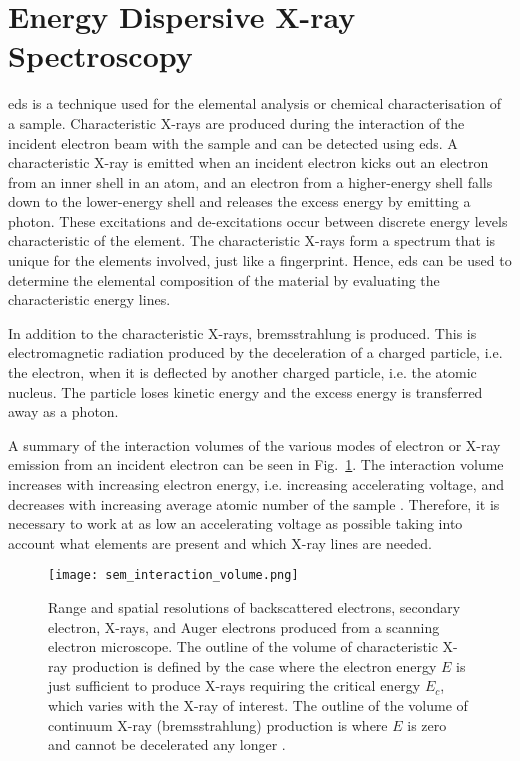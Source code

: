 \section{Energy Dispersive X-ray Spectroscopy}\label{sec:eds}
\Acf{eds} is a technique used for the elemental analysis or chemical characterisation of a sample. Characteristic X-rays are produced during the interaction of the incident electron beam with the sample and can be detected using \ac{eds}. A characteristic X-ray is emitted when an incident electron kicks out an electron from an inner shell in an atom, and an electron from a higher-energy shell falls down to the lower-energy shell and releases the excess energy by emitting a photon. These excitations and de-excitations occur between discrete energy levels characteristic of the element. The characteristic X-rays form a spectrum that is unique for the elements involved, just like a fingerprint. Hence, \ac{eds} can be used to determine the elemental composition of the material by evaluating the characteristic energy lines. 

In addition to the characteristic X-rays, bremsstrahlung is produced. This is electromagnetic radiation produced by the deceleration of a charged particle, i.e. the electron, when it is deflected by another charged particle, i.e. the atomic nucleus. The particle loses kinetic energy and the excess energy is transferred away as a photon.

A summary of the interaction volumes of the various modes of electron or X-ray emission from an incident electron can be seen in Fig.~\ref{fig:sem_interaction_volume}. The interaction volume increases with increasing electron energy, i.e. increasing accelerating voltage, and decreases with increasing average atomic number of the sample \citep{goldstein2012scanning}. Therefore, it is necessary to work at as low an accelerating voltage as possible taking into account what elements are present and which X-ray lines are needed.%

\begin{figure}[htbp]
    \centering
    \texttt{[image: sem\_interaction\_volume.png]}
    \caption[Range and spatial resolutions of backscattered electrons, secondary electron, X-rays, and Auger electrons produced from a SEM.]{Range and spatial resolutions of backscattered electrons, secondary electron, X-rays, and Auger electrons produced from a scanning electron microscope. The outline of the volume of characteristic X-ray production is defined by the case where the electron energy $E$ is just sufficient to produce X-rays requiring the critical energy $E_c$, which varies with the X-ray of interest. The outline of the volume of continuum X-ray (bremsstrahlung) production is where $E$ is zero and cannot be decelerated any longer \citep[Reprinted from][]{goldstein2012scanning}.}
    \label{fig:sem_interaction_volume}
\end{figure}

